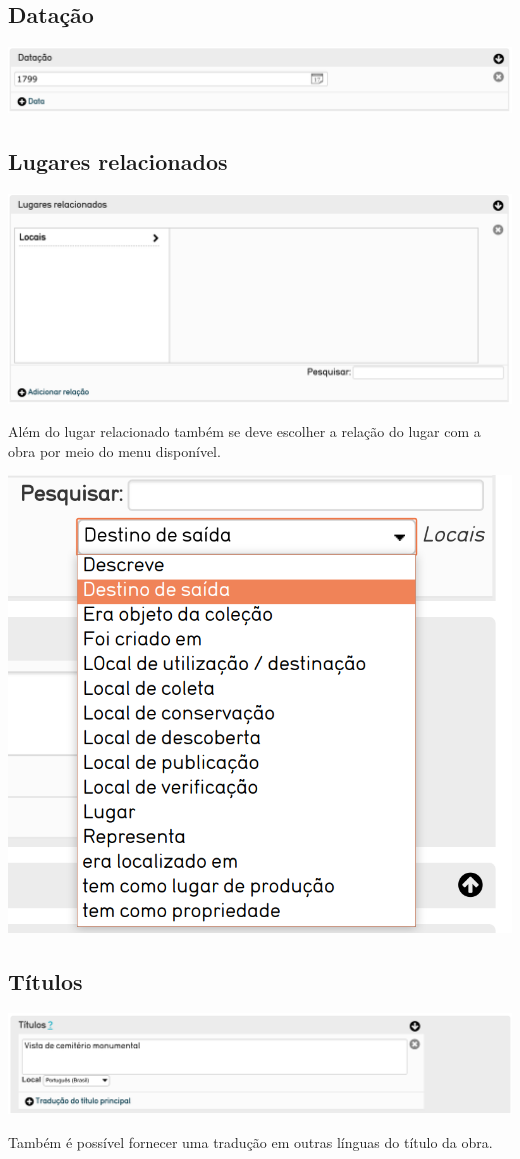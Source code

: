 \subsection{Datação}
\begin{flushleft}
	\includegraphics[width=\linewidth]{elemento-03}
\end{flushleft}

\subsection{Lugares relacionados}
\begin{flushleft}
	\includegraphics[width=\linewidth]{elemento-04}
\end{flushleft}

Além do lugar relacionado também se deve escolher a relação do lugar com a obra por meio do menu disponível.

\begin{flushleft}
	\includegraphics[width=0.5\linewidth]{descreveLugar}
\end{flushleft}

\subsection{Títulos}
\begin{flushleft}
	\includegraphics[width=\linewidth]{elemento-05}
\end{flushleft}
Também é possível fornecer uma tradução em outras línguas do título da obra.

